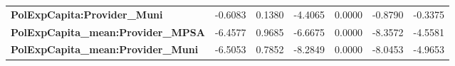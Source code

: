 \begin{center}
\begin{tabular}{lcccccc}
\textbf{PolExpCapita:Provider\_Muni}       &      -0.6083       &       0.1380       &     -4.4065     &      0.0000      &      -0.8790      &      -0.3375       \\
\textbf{PolExpCapita\_mean:Provider\_MPSA} &      -6.4577       &       0.9685       &     -6.6675     &      0.0000      &      -8.3572      &      -4.5581       \\
\textbf{PolExpCapita\_mean:Provider\_Muni} &      -6.5053       &       0.7852       &     -8.2849     &      0.0000      &      -8.0453      &      -4.9653       \\
\bottomrule
\end{tabular}
\end{center}

